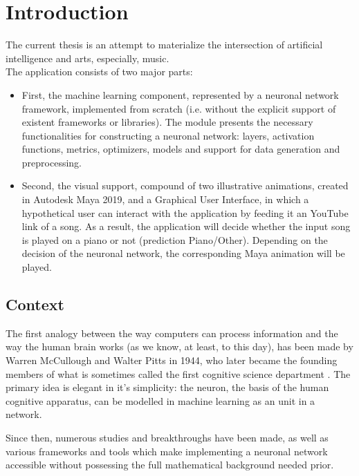 \chapter*{Introduction}

The current thesis is an attempt to materialize the intersection of artificial intelligence and arts, especially, music. \\

The application consists of two major parts:\\
	\begin{itemize}
	\addtolength{\itemindent}{1cm}
		\item  First, the machine learning component, represented by a neuronal network framework, implemented from scratch (i.e. without the explicit support of existent frameworks or libraries). The module presents the necessary functionalities for constructing a neuronal network: layers, activation functions, metrics, optimizers, models and support for data generation and preprocessing.\\

		\item Second, the visual support, compound of two illustrative animations, created in Autodesk Maya 2019, and a Graphical User Interface, in which a hypothetical user can interact with the application by feeding it an YouTube link of a song. As a result, the application will decide whether the input song is played on a piano or not (prediction Piano/Other). Depending on the decision of the neuronal network, the corresponding Maya animation will be played.\\
	\end{itemize}

	\section{Context}

	The first analogy between the way computers can process information and the way the human brain works (as we know, at least, to this day), has been made by Warren McCullough and Walter Pitts in 1944, who later became the founding members of what is sometimes called the first cognitive science department \cite{mitnn}. The primary idea is elegant in it's simplicity: the neuron, the basis of the human cognitive apparatus, can be modelled in machine learning as an unit in a network.

	Since then, numerous studies and breakthroughs have been made, as well as various frameworks and tools which make implementing a neuronal network accessible without possessing the full mathematical background needed prior.

